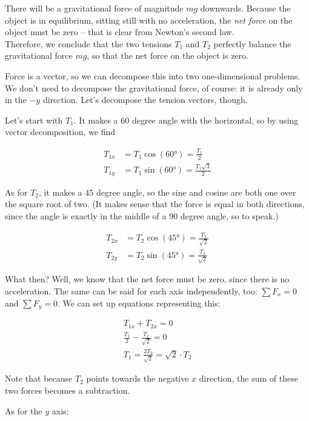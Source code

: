\documentclass[8.01x]{subfiles}
\begin{document}
There will be a gravitational force of magnitude $m g$ downwards. Because the object is in equilibrium, sitting still with no acceleration, the \emph{net force} on the object must be zero -- that is clear from Newton's second law.\\
Therefore, we conclude that the two tensions $T_1$ and $T_2$ perfectly balance the gravitational force $m g$, so that the net force on the object is zero.

Force is a vector, so we can decompose this into two one-dimensional problems. We don't need to decompose the gravitational force, of course: it is already only in the $-y$ direction. Let's decompose the tension vectors, though.

Let's start with $T_1$. It makes a 60 degree angle with the horizontal, so by using vector decomposition, we find

\begin{align}
T_{1x} &= T_1 \cos(\ang{60}) = \frac{T_1}{2}\\
T_{1y} &= T_1 \sin(\ang{60}) = \frac{T_1 \sqrt{3}}{2}
\end{align}

As for $T_2$, it makes a 45 degree angle, so the sine and cosine are both one over the square root of two. (It makes sense that the force is equal in both directions, since the angle is exactly in the middle of a 90 degree angle, so to speak.)

\begin{align}
T_{2x} &= T_2 \cos(\ang{45}) = \frac{T_2}{\sqrt{2}}\\
T_{2y} &= T_2 \sin(\ang{45}) = \frac{T_2}{\sqrt{2}}
\end{align}

What then? Well, we know that the net force must be zero, since there is no acceleration. The same can be said for each axis independently, too: $\sum F_x = 0$ and $\sum F_y = 0$. We can set up equations representing this:

\begin{align}
T_{1x} + T_{2x} = 0\\
\frac{T_1}{2} - \frac{T_2}{\sqrt{2}} = 0\\
T_1 = \frac{2 T_2}{\sqrt{2}} = \sqrt{2} \cdot T_2 \label{eq:lec6_t1}
\end{align}

Note that because $T_2$ points towards the negative $x$ direction, the sum of these two forces becomes a subtraction.

As for the $y$ axis:
\end{document}
